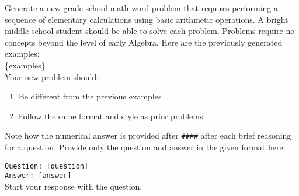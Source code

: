 \begin{tcolorbox}[colback=purple!5!white,colframe=purple!75!black,title=Sequential Prompt]
Generate a new grade school math word problem that requires performing a sequence of elementary calculations using basic arithmetic operations. A bright middle school student should be able to solve each problem. Problems require no concepts beyond the level of early Algebra. Here are the previously generated examples:\\

\{examples\}\\

Your new problem should:
\begin{enumerate}
    \item Be different from the previous examples
    \item Follow the same format and style as prior problems
\end{enumerate}

Note how the numerical answer is provided after \texttt{\#\#\#\#} after each brief reasoning for a question. Provide only the question and answer in the given format here:

\texttt{Question: [question]} \\
\texttt{Answer: [answer]}\\

Start your response with the question.
\end{tcolorbox}
